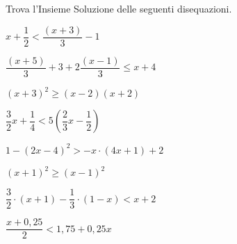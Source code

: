 \begin{esercizio}[\Ast]
 \label{ese:21.14}
Trova l'Insieme Soluzione delle seguenti disequazioni.
 \begin{multicols}{2}
 \begin{enumeratea}
 \item \(x+\dfrac{1}{2}<\dfrac{(x+3)}{3}-1\)
\item \(\dfrac{(x+5)}{3}+3+2\dfrac{(x-1)}{3}\le x+4\)
\item \((x+3)^{2}\ge (x-2)(x+2)\)
\item \(\dfrac{3}{2}x+\dfrac{1}{4}<5\left(\dfrac{2}{3}x-\dfrac{1}{2}\right)\)
\item \(1-(2x-4)^{2}>-x\cdot (4x+1)+2\)
\item \((x+1)^{2}\ge (x-1)^{2}\)
\item \(\dfrac{3}{2}\cdot (x+1)-\dfrac{1}{3}\cdot (1-x)<x+2\)
\item \(\dfrac{x+0,25}{2}<1,75+0,25x\)
\end{enumeratea}
\end{multicols}
\end{esercizio}

